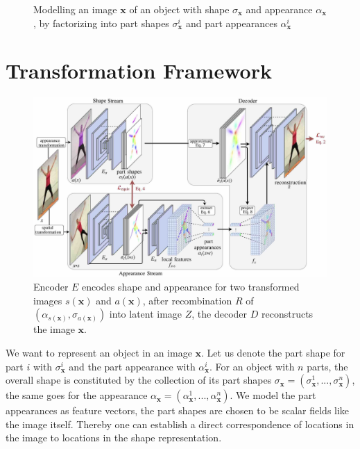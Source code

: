 	\begin{figure}[htp]
		\centering
		
		\caption{Modelling an image $\mathbf{x}$ of an object with shape ${\sigma}_{\mathbf{x}}$ and appearance $\alpha_{\mathbf{x}}$, by factorizing into part shapes ${{\sigma}}^i_{\mathbf{x}}$ and part appearances ${\alpha}^i_{\mathbf{x}}$}
		\label{fig:representation}
	\end{figure}

\section{Transformation Framework}\label{sec:framework}
	\begin{figure}[t]
		\centering
		\includegraphics[trim={0cm 0cm 0cm 0cm},clip, width=1.\linewidth]{fig/other/architecture_final}
		\caption{Encoder $E$ encodes shape and appearance for two transformed images $s(\mathbf{x})$ and $a(\mathbf{x})$, after recombination $R$ of $({\alpha}_{s(\mathbf{x})}, {\sigma}_{a(\mathbf{x})})$ into latent image $Z$, the decoder $D$ reconstructs the image $\mathbf{x}$.}
		\label{fig:architecture}
	\end{figure}
	We want to represent an object in an image $\mathbf{x}$. Let us denote the part shape for part $i$ with ${\sigma}^i_\mathbf{x}$ and the part appearance with ${\alpha}^i_\mathbf{x}$. For an object with $n$ parts, the overall shape is constituted by the collection of its part shapes ${\sigma}_\mathbf{x} =  ({\sigma}^1_\mathbf{x}, ...,  {\sigma}^n_\mathbf{x})$, the same goes for the appearance ${\alpha}_\mathbf{x} =  (\alpha^1_\mathbf{x}, ...,  \alpha^n_\mathbf{x})$. We model the part appearances as feature vectors, the part shapes are chosen to be scalar fields like the image itself. Thereby one can establish a direct correspondence of locations in the image to locations in the shape representation.\\
